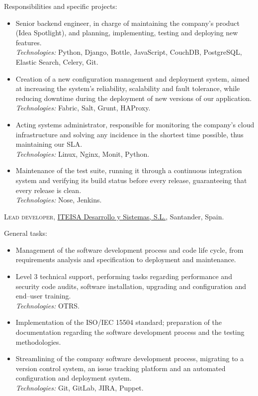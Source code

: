 \documentclass[11pt]{article}
\newcommand{\years}[1]{\marginnote{\scriptsize #1}}
\begin{document}
Responsibilities and specific projects:
\begin{itemize}
	\item  Senior backend engineer, in charge of maintaining the company's product (Idea Spotlight), and planning, implementing, testing and deploying new features.\\
	\textit{Technologies:} Python, Django, Bottle, JavaScript, CouchDB, PostgreSQL, Elastic Search, Celery, Git.
	\item  Creation of a new configuration management and deployment system, aimed at increasing the system's reliability, scalability and fault tolerance, while reducing downtime during the deployment of new versions of our application.\\
	\textit{Technologies:} Fabric, Salt, Grunt, HAProxy.
	\item  Acting systems administrator, responsible for monitoring the company's cloud infrastructure and solving any incidence in the shortest time possible, thus maintaining our SLA.\\
	\textit{Technologies:} Linux, Nginx, Monit, Python.
	\item  Maintenance of the test suite, running it through a continuous integration system and verifying its build status before every release, guaranteeing that every release is clean.\\
	\textit{Technologies:} Nose, Jenkins.
\end{itemize}

\years{2011--2013}\textsc{Lead developer}, \href{http://www.iteisa.com}{ITEISA Desarrollo y Sistemas, S.L.}, Santander, Spain.

General tasks:
\begin{itemize}
	\item  Management of the software development process and code life cycle, from requirements analysis and specification to deployment and maintenance.
	\item  Level 3 technical support, performing tasks regarding performance and security code audits, software installation, upgrading and configuration and end--user training.\\
	\textit{Technologies:} OTRS.
	\item  Implementation of the ISO/IEC 15504 standard; preparation of the documentation regarding the software development process and the testing methodologies.
	\item  Streamlining of the company software development process, migrating to a version control system, an issue tracking platform and an automated configuration and deployment system.\\
	\textit{Technologies:} Git, GitLab, JIRA, Puppet.
\end{itemize}
\end{document}
